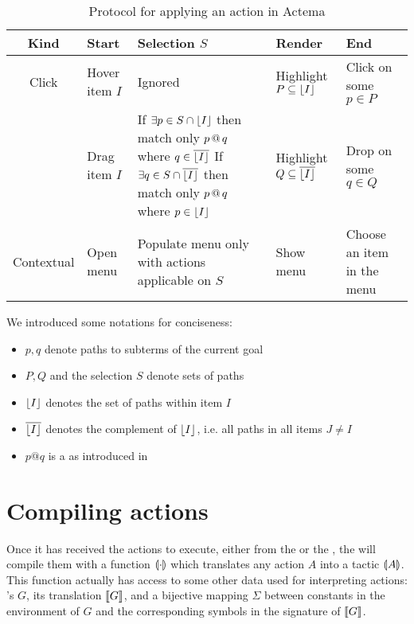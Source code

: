\begin{table*}[]
  \def\arraystretch{1.5}
  \begin{tabular}{|c|C{0.2\textwidth}|C{0.4\textwidth}|C{0.25\textwidth}|C{0.2\textwidth}|}
  \hline
  \textbf{Kind} & \textbf{Start}       & \textbf{Selection $S$} &
  \textbf{Render}                      & \textbf{End} \\ \hline
  Click         & Hover item $I$       & Ignored & Highlight $P \subseteq
  \lfloor I \rfloor$ & Click on some $p \in P$    \\ \hline
             & Drag item $I$        &
      If $\exists p \in S \cap \lfloor I \rfloor$ then match only $p \operatorname{\mathrel{@}} q$ where
      $q \in \overline{\lfloor I \rfloor}$
      \newline
      If $\exists q \in S \cap \overline{\lfloor I \rfloor}$ then match only $p
      \operatorname{\mathrel{@}} q$ where $p \in \lfloor I \rfloor$
    & Highlight $Q \subseteq \overline{\lfloor I \rfloor}$ & Drop on some $q \in Q$ \\ \hline
  Contextual    & Open menu & Populate menu only with actions
  applicable on $S$ & Show menu & Choose an item in the menu \\ \hline
  \end{tabular}
  \raggedright
  \parbox{\textwidth}{
    \vspace{1.5em}
    We introduced some notations for conciseness:
    \begin{itemize}
      \item $p, q$ denote paths to subterms of the current goal
      \item $P, Q$ and the selection $S$ denote sets of paths
      \item $\lfloor I \rfloor$ denotes the set of paths within item $I$
      \item $\overline{\lfloor I \rfloor}$ denotes the complement of $\lfloor I \rfloor$, i.e.
      all paths in all items $J \not= I$
      \item $p @ q$ is a  as introduced in 
    \end{itemize}}

  \caption{Protocol for applying an action in Actema}
\end{table*}


\section{Compiling actions}

Once it has received the actions to execute, either from the 
or the , the  will compile them with a function
$\llparenthesis \cdot \rrparenthesis$ which translates any action $A$ into a  tactic
$\llparenthesis A \rrparenthesis$. This function actually has access to some other data used for
interpreting actions: 's  $G$, its  translation $\llbracket G \rrbracket$, and a
bijective mapping $\Sigma$ between  constants in the environment of $G$ and
the corresponding  symbols in the  signature of $\llbracket G \rrbracket$.

